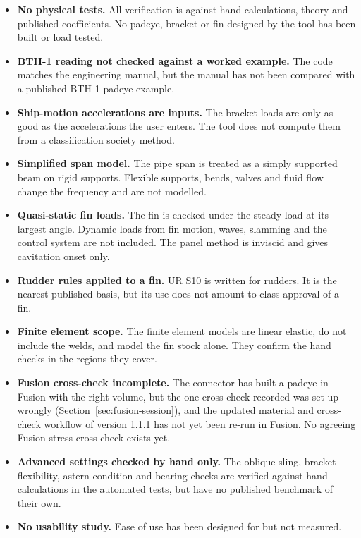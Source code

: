 \begin{itemize}
    \item \textbf{No physical tests.} All verification is against hand
    calculations, theory and published coefficients. No padeye, bracket or fin
    designed by the tool has been built or load tested.
    \item \textbf{BTH-1 reading not checked against a worked example.} The code
    matches the engineering manual, but the manual has not been compared with
    a published BTH-1 padeye example.
    \item \textbf{Ship-motion accelerations are inputs.} The bracket loads are
    only as good as the accelerations the user enters. The tool does not
    compute them from a classification society method.
    \item \textbf{Simplified span model.} The pipe span is treated as a simply
    supported beam on rigid supports. Flexible supports, bends, valves and
    fluid flow change the frequency and are not modelled.
    \item \textbf{Quasi-static fin loads.} The fin is checked under the steady
    load at its largest angle. Dynamic loads from fin motion, waves, slamming
    and the control system are not included. The panel method is inviscid and
    gives cavitation onset only.
    \item \textbf{Rudder rules applied to a fin.} UR S10 is written for
    rudders. It is the nearest published basis, but its use does not amount to
    class approval of a fin.
    \item \textbf{Finite element scope.} The finite element models are linear
    elastic, do not include the welds, and model the fin stock alone. They
    confirm the hand checks in the regions they cover.
    \item \textbf{Fusion cross-check incomplete.} The connector has built a
    padeye in Fusion with the right volume, but the one cross-check recorded
    was set up wrongly (Section~\ref{sec:fusion-session}), and the updated
    material and cross-check workflow of version 1.1.1 has not yet been re-run in Fusion. No agreeing Fusion
    stress cross-check exists yet.
    \item \textbf{Advanced settings checked by hand only.} The oblique sling,
    bracket flexibility, astern condition and bearing checks are verified
    against hand calculations in the automated tests, but have no published
    benchmark of their own.
    \item \textbf{No usability study.} Ease of use has been designed for but
    not measured.
\end{itemize}
